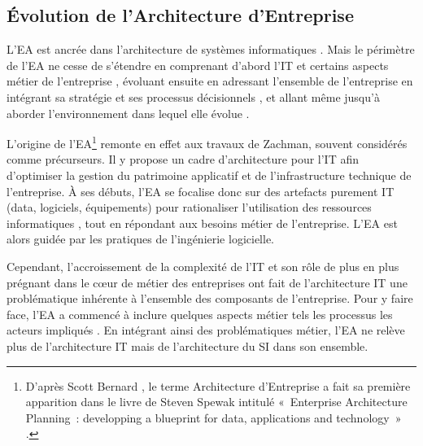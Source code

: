 
\subsection{Évolution de l'Architecture d'Entreprise}

L'EA est ancrée dans l'architecture de systèmes informatiques
\cite{kappelman2008enterprise}. Mais le périmètre de l'EA ne cesse de s'étendre
en comprenant d'abord l'IT et certains aspects métier de l'entreprise
\cite{winter2006essential}, évoluant ensuite en adressant l'ensemble de
l'entreprise en intégrant sa stratégie et ses processus décisionnels
\cite{ross2006enterprise}, et allant même jusqu'à aborder l'environnement dans
lequel elle évolue \cite{lapalme2012three}.

L'origine de l'EA\footnote{D'après Scott Bernard
\cite{bernard2012introduction}, le terme Architecture d'Entreprise a fait sa
première apparition dans le livre de Steven Spewak intitulé «~Enterprise
Architecture Planning~: developping a blueprint for data, applications and
technology~» \cite{spewak1993enterprise}.} remonte en effet aux travaux de
Zachman, souvent considérés comme précurseurs.  Il y propose un cadre
d'architecture pour l'IT \cite{zachman1987framework} afin d'optimiser la
gestion du patrimoine applicatif et de l'infrastructure technique de
l'entreprise. À ses débuts, l'EA se focalise donc sur des artefacts purement IT
(data, logiciels, équipements) pour rationaliser l'utilisation des ressources
informatiques \cite{winter2006essential}, tout en répondant aux besoins métier
de l'entreprise. L'EA est alors guidée par les pratiques de l'ingénierie
logicielle. 

Cependant, l'accroissement de la complexité de l'IT et son rôle de plus en plus
prégnant dans le cœur de métier des entreprises
\cite{ranganathan2005enterprise} ont fait de l'architecture IT une
problématique inhérente à l'ensemble des composants de l'entreprise. Pour y
faire face, l'EA a commencé à inclure quelques aspects métier tels les
processus les acteurs impliqués \cite{winter2006essential}. En intégrant ainsi
des problématiques métier, l'EA ne relève plus de l'architecture IT mais de
l'architecture du SI dans son ensemble.

